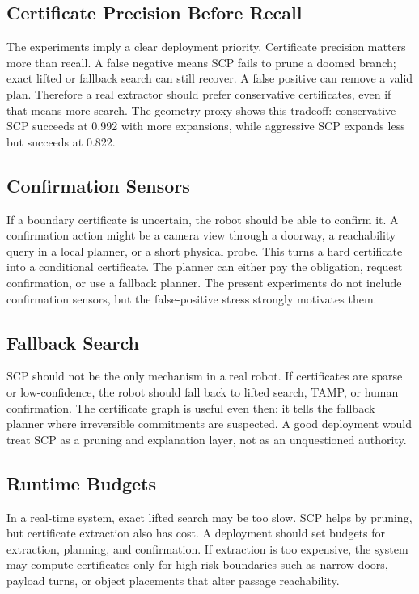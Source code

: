 \documentclass{article}
\begin{document}
\subsection{Certificate Precision Before Recall}

The experiments imply a clear deployment priority. Certificate precision matters more than recall. A false negative means SCP fails to prune a doomed branch; exact lifted or fallback search can still recover. A false positive can remove a valid plan. Therefore a real extractor should prefer conservative certificates, even if that means more search. The geometry proxy shows this tradeoff: conservative SCP succeeds at 0.992 with more expansions, while aggressive SCP expands less but succeeds at 0.822.

\subsection{Confirmation Sensors}

If a boundary certificate is uncertain, the robot should be able to confirm it. A confirmation action might be a camera view through a doorway, a reachability query in a local planner, or a short physical probe. This turns a hard certificate into a conditional certificate. The planner can either pay the obligation, request confirmation, or use a fallback planner. The present experiments do not include confirmation sensors, but the false-positive stress strongly motivates them.

\subsection{Fallback Search}

SCP should not be the only mechanism in a real robot. If certificates are sparse or low-confidence, the robot should fall back to lifted search, TAMP, or human confirmation. The certificate graph is useful even then: it tells the fallback planner where irreversible commitments are suspected. A good deployment would treat SCP as a pruning and explanation layer, not as an unquestioned authority.

\subsection{Runtime Budgets}

In a real-time system, exact lifted search may be too slow. SCP helps by pruning, but certificate extraction also has cost. A deployment should set budgets for extraction, planning, and confirmation. If extraction is too expensive, the system may compute certificates only for high-risk boundaries such as narrow doors, payload turns, or object placements that alter passage reachability.
\end{document}
